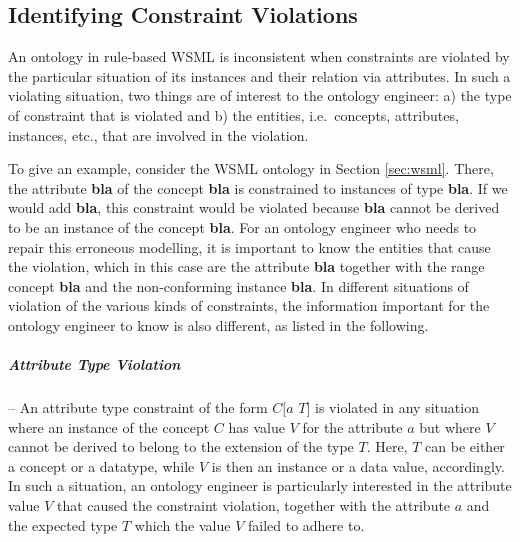 \subsection{Identifying Constraint Violations}

An ontology in rule-based WSML is inconsistent when constraints
are violated by the particular situation of its instances and
their relation via attributes. In such a violating situation, two
things are of interest to the ontology engineer: a) the type of
constraint that is violated and b) the entities, i.e.\ concepts,
attributes, instances, etc., that are involved in the violation.

\def\bla{\textbf{{\sf bla}}\xspace}
To give an example, consider the WSML ontology in Section
\ref{sec:wsml}. There, the attribute \bla of the concept \bla is
constrained to instances of type \bla. If we would add \bla, this
constraint would be violated because \bla cannot be derived to be
an instance of the concept \bla. For an ontology engineer who
needs to repair this erroneous modelling, it is important to know
the entities that cause the violation, which in this case are the
attribute \bla together with the range concept \bla and the
non-conforming instance \bla. In different situations of violation
of the various kinds of constraints, the information important for
the ontology engineer to know is also different, as listed in the
following.

\subparagraph{Attribute Type Violation} -- An attribute type
constraint of the form $C[a$  $T]$ is violated in any
situation where an instance of the concept $C$ has value $V$ for
the attribute $a$ but where $V$ cannot be derived to belong to the
extension of the type $T$. Here, $T$ can be either a concept or a
datatype, while $V$ is then an instance or a data value,
accordingly. In such a situation, an ontology engineer is
particularly interested in the attribute value $V$ that caused the
constraint violation, together with the attribute $a$ and the
expected type $T$ which the value $V$ failed to adhere to.

